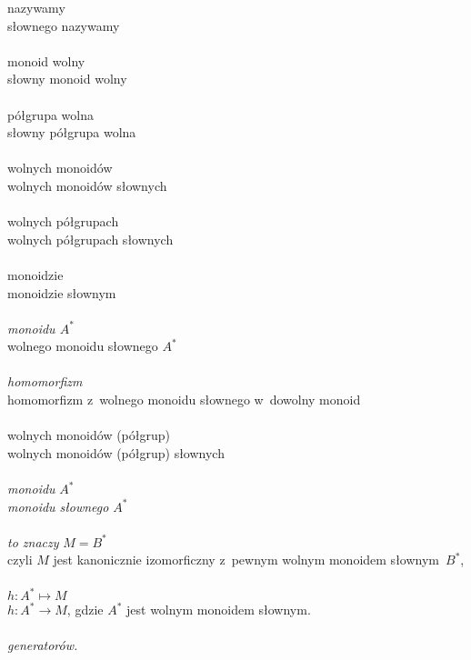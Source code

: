 \documentclass[a4paper,11pt]{article}
\begin{document}
\Jest  nazywamy \\
\Powin słownego nazywamy \\
 \\
\Jest  monoid wolny \\
\Powin słowny monoid wolny \\
 \\
\Jest  półgrupa wolna \\
\Powin słowny półgrupa wolna \\
 \\
\Jest  wolnych monoidów \\
\Powin wolnych monoidów słownych \\
 \\
\Jest  wolnych półgrupach \\
\Powin wolnych półgrupach słownych \\
 \\
\Jest  monoidzie \\
\Powin monoidzie słownym \\
 \\
\Jest  \textit{monoidu $A^{ * }$} \\
\Powin wolnego monoidu słownego $A^{ * }$ \\
 \\
\Jest  \textit{homomorfizm} \\
\Powin homomorfizm z~wolnego monoidu słownego w~dowolny monoid \\
 \\
\Jest  wolnych monoidów (półgrup) \\
\Powin wolnych monoidów (półgrup) słownych \\
 \\
\Jest  \textit{monoidu} $A^{ * }$ \\
\Powin \textit{monoidu słownego} $A^{ * }$ \\
 \\
\Jest  \textit{to znaczy} $M = B^{ * }$ \\
\Powin czyli $M$ jest kanonicznie izomorficzny z~pewnym wolnym monoidem
słownym~$B^{ * }$, \\
 \\
\Jest  $h : A^{ * } \mapsto M$ \\
\Powin $h : A^{ * } \to M$, gdzie $A^{ * }$ jest wolnym monoidem słownym. \\
 \\
\Jest  \textit{generatorów.} \\
\end{document}
